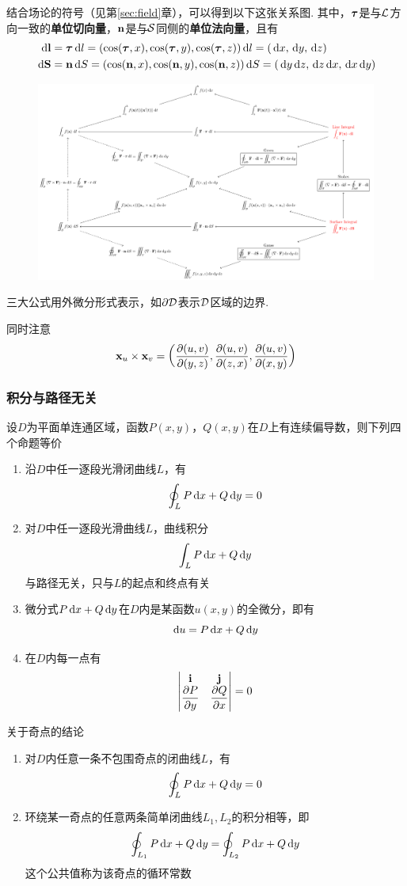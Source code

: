 结合场论的符号（见第\ref{sec:field}章），可以得到以下这张关系图.
其中，$\bm{\tau}$是与$\mathcal{L}$方向一致的\textbf{单位切向量}，$\mathbf{n}$是与$\mathcal{S}$同侧的\textbf{单位法向量}，且有
\[\begin{aligned}
\,\mathrm{d}\mathbf{l}&=\bm{\tau}\,\mathrm{d} l=(\cos(\bm{\tau},x),\cos(\bm{\tau},y),\cos(\bm{\tau},z))\,\mathrm{d} l=(\,\mathrm{d} x,\,\mathrm{d} y,\,\mathrm{d} z)\\
\,\mathrm{d}\mathbf{S}&=\mathbf{n}\,\mathrm{d} S=(\cos(\mathbf{n},x),\cos(\mathbf{n},y),\cos(\mathbf{n},z))\,\mathrm{d} S=(\,\mathrm{d} y\,\mathrm{d} z,\,\mathrm{d} z\,\mathrm{d} x,\,\mathrm{d} x\,\mathrm{d} y)
\end{aligned}\]
\begin{figure}[H]
\centering
\includegraphics[width=\linewidth]{fig/multivar-integral-relationship.pdf}
\end{figure}
\par 三大公式用外微分形式表示，如$\partial\mathcal{D}$表示$\mathcal{D}$区域的边界.
\par 同时注意
\[\mathbf{x}_u\times\mathbf{x}_v=\left(\dfrac{\partial (u,v)}{\partial (y,z)},\dfrac{\partial (u,v)}{\partial (z,x)},\dfrac{\partial (u,v)}{\partial (x,y)}\right)\]

\subsubsection{积分与路径无关}
\begin{theorem}
设$D$为平面单连通区域，函数$P(x,y)$，$Q(x,y)$在$D$上有连续偏导数，则下列四个命题等价
\begin{enumerate}
	\item 沿$D$中任一逐段光滑闭曲线$L$，有
	\[\oint_LP\,\mathrm{d} x+Q\,\mathrm{d} y=0\]
	\item 对$D$中任一逐段光滑曲线$L$，曲线积分
	\[\int_LP\,\mathrm{d} x+Q\,\mathrm{d} y\]
	与路径无关，只与$L$的起点和终点有关
	\item 微分式$P\,\mathrm{d} x+Q\,\mathrm{d} y$在$D$内是某函数$u(x,y)$的全微分，即有
	\[\,\mathrm{d} u=P\,\mathrm{d} x+Q\,\mathrm{d} y\]
	\item 在$D$内每一点有
	\[\begin{vmatrix}\mathbf{i}&\mathbf{j}\\\dfrac{\partial P}{\partial y}&\dfrac{\partial Q}{\partial x}\end{vmatrix}=0\]
\end{enumerate}
\end{theorem}
\begin{theorem}[奇点]
关于奇点的结论
\begin{enumerate}
	\item 对$D$内任意一条不包围奇点的闭曲线$L$，有
	\[\oint_LP\,\mathrm{d} x+Q\,\mathrm{d} y=0\]
	\item 环绕某一奇点的任意两条简单闭曲线$L_1,L_2$的积分相等，即
	\[\oint_{L_1}P\,\mathrm{d} x+Q\,\mathrm{d} y=\oint_{L_2}P\,\mathrm{d} x+Q\,\mathrm{d} y\]
	这个公共值称为该奇点的循环常数
\end{enumerate}
\end{theorem}